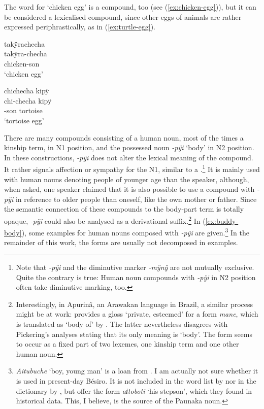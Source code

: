 The word for ‘chicken egg’ is a compound, too (see (\ref{ex:chicken-egg})), but it can be considered a lexicalised compound, since other eggs of animals are rather expressed periphrastically, as in (\ref{ex:turtle-egg}). %

\ea\label{ex:chicken-egg}
\begingl
\glpreamble takÿrachecha\\
\gla takÿra-checha\\
\glb chicken-son\\
\glft ‘chicken egg’
\endgl
\xe

\ea\label{ex:turtle-egg}
\begingl
\glpreamble chichecha kipÿ\\
\gla chi-checha kipÿ\\
-son tortoise\\
\glft ‘tortoise egg’
\endgl
\xe


There are many compounds consisting of a human noun,  most of the times a kinship term, in N1 position, and the possessed noun \textit{-pÿi} ‘body’ in N2 position. In these constructions, \textit{-pÿi} does not alter the lexical meaning of the compound. It rather signals affection or sympathy for the N1, similar to a .\footnote{Note that \textit{-pÿi} and the diminutive marker \textit{-mÿnÿ} are not mutually exclusive. Quite the contrary is true: Human noun compounds with \textit{-pÿi} in N2 position often take diminutive marking, too.} It is mainly used with human nouns denoting people of younger age than the speaker, although, when asked, one speaker claimed that it is also possible to use a compound with \textit{-pÿi} in reference to older people than oneself, like the own mother or father. Since the semantic connection of these compounds to the body-part term is totally opaque, \textit{-pÿi} could also be analysed as a derivational suffix.\footnote{Interestingly, in Apurinã, an Arawakan language in Brazil, a similar process might be at work: \citet[15]{Pickering2009} provides a gloss ‘private, esteemed’ for a form \textit{mane}, which is translated as ‘body of’ by \citet[265]{Facundes2000}. The latter nevertheless disagrees with Pickering’s analyses stating that its only meaning is ‘body’. The form seems to occur as a fixed part of two lexemes, one kinship term and one other human noun.}
 In (\ref{ex:buddy-body}), some examples for human nouns composed with \textit{-pÿi} are given.\footnote{\textit{Aitubuche} ‘boy, young man’ is a loan from . I am actually not sure whether it is used in present-day Bésiro. It is not included in the word list by \citet[]{Sans2011} nor in the dictionary by \citet[]{FussRiester1986}, but \citet[479]{Adelaar2004} offer the form \textit{aɨtoboti} ‘his stepson’, which they found in historical data. This, I believe, is the source of the Paunaka noun.} In the remainder of this work, the forms are usually not decomposed in examples.

